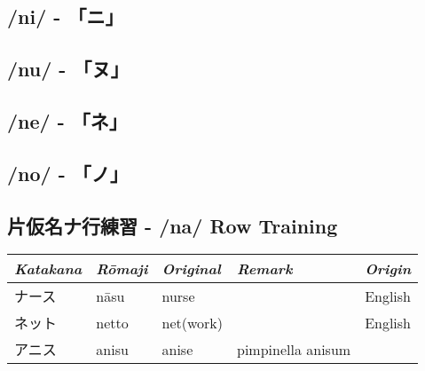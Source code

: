 \subsection{/ni/ - 「ニ」} \label{sec:KatakanaNi}

 

\subsection{/nu/ - 「ヌ」} \label{sec:KatakanaNu}

 

\subsection{/ne/ - 「ネ」} \label{sec:KatakanaNe}

 

\subsection{/no/ - 「ノ」} \label{sec:KatakanaNo}

 

\subsection{片仮名ナ行練習 -  /na/ Row Training}
\Padding
\begin{longtable}[c]{p{2cm}p{2cm}p{3cm}p{6cm}p{2cm}}
\textit{Katakana}&\textit{Rōmaji}&\textit{Original}&\textit{Remark}&\textit{Origin}\\\hline
ナース  &nāsu &nurse      &                                        &English\\
ネット  &netto&net(work)  &                                        &English\\
アニス　&anisu&anise      &pimpinella anisum                       &\\
\end{longtable}

